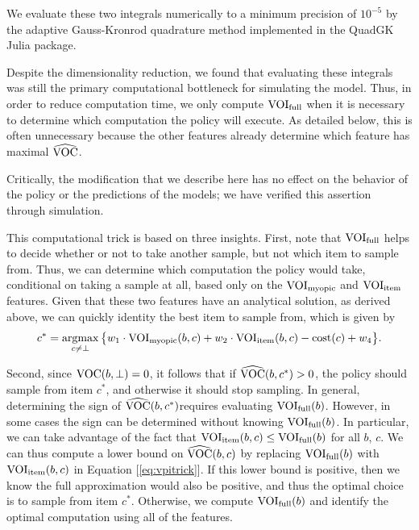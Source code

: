 We evaluate these two integrals numerically to a minimum precision of $10^{-5}$ by the adaptive Gauss-Kronrod quadrature method implemented in the QuadGK Julia package.

Despite the dimensionality reduction, we found that evaluating these integrals was still the primary computational bottleneck for simulating the model. Thus, in order to reduce computation time, we only compute $\text{VOI}_\text{full}$ when it is necessary to determine which computation the policy will execute. As detailed below, this is often unnecessary because the other features already determine which feature has maximal $\widehat{\text{VOC}}$.

Critically, the modification that we describe here has no effect on the behavior of the policy or the predictions of the models; we have verified this assertion through simulation.

This computational trick is based on three insights. First, note that $\text{VOI}_\text{full}$ helps to decide whether or not to take another sample, but not which item to sample from. Thus, we can determine which computation the policy would take, conditional on taking a sample at all, based only on the $\text{VOI}_\text{myopic}$ and $\text{VOI}_\text{item}$ features. Given that these two features have an analytical solution, as derived above, we can quickly identity the best item to sample from, which is given by
%
\begin{equation}
\label{eq:vpitrick}
  c^{*}= \operatorname*{argmax}_{c\neq\bot} \big\{ 
    w_{1}\cdot\text{VOI}_\text{myopic}(b,c)+w_{2}\cdot \text{VOI}_\text{item}(b,c)
    - \text{cost}(c)+w_{4} \big\} .
\end{equation}
%

Second, since $\text{VOC}(b,\bot)=0$, it follows that if $\widehat{\text{VOC}}(b,c^{*})>0$, the policy should sample from item $c^{*}$, and otherwise it should stop sampling. In general, determining the sign of $\widehat{\text{VOC}}(b,c^{*})$requires evaluating $\text{VOI}_\text{full}(b)$. However, in some cases the sign can be determined without knowing $\text{VOI}_\text{full}(b)$. In particular, we can take advantage of the fact that $\text{VOI}_\text{item}(b,c)\leq \text{VOI}_\text{full}(b)$ for all $b$, $c$. We can thus compute a lower bound on $\widehat{\text{VOC}}(b,c)$ by replacing $\text{VOI}_\text{full}(b)$ with $\text{VOI}_\text{item}(b,c)$ in Equation [\ref{eq:vpitrick}]. If this lower bound is positive, then we know the full approximation would also be positive, and thus the optimal choice is to sample from item $c^{*}$. Otherwise, we compute $\text{VOI}_\text{full}(b)$ and identify the optimal computation using all of the features.

